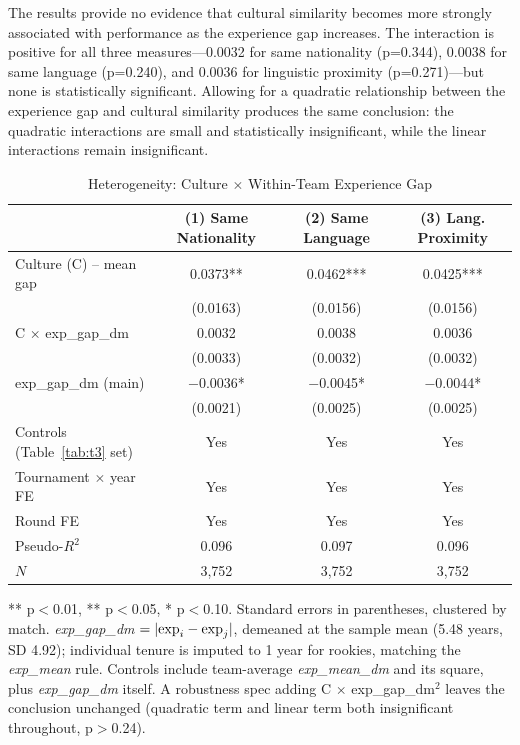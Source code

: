 \documentclass[10pt]{article}
\begin{document}
The results provide no evidence that cultural similarity becomes more strongly associated with performance as the experience gap increases. The interaction is positive for all three measures—0.0032 for same nationality (p=0.344), 0.0038 for same language (p=0.240), and 0.0036 for linguistic proximity (p=0.271)—but none is statistically significant. Allowing for a quadratic relationship between the experience gap and cultural similarity produces the same conclusion: the quadratic interactions are small and statistically insignificant, while the linear interactions remain insignificant.

\begin{table}[htbp]
\color{blue}
\centering
\caption{Heterogeneity: Culture $\times$ Within-Team Experience Gap \label{tab:t6b}}
\begin{threeparttable}
\begin{tabular}{lccc}
\toprule
 & (1) Same Nationality & (2) Same Language & (3) Lang. Proximity \\
\midrule
Culture (C) -- mean gap & 0.0373** & 0.0462*** & 0.0425*** \\
 & (0.0163) & (0.0156) & (0.0156) \\
C $\times$ exp\_gap\_dm & 0.0032 & 0.0038 & 0.0036 \\
 & (0.0033) & (0.0032) & (0.0032) \\
exp\_gap\_dm (main) & $-$0.0036* & $-$0.0045* & $-$0.0044* \\
 & (0.0021) & (0.0025) & (0.0025) \\
\midrule
Controls (Table~\ref{tab:t3} set) & Yes & Yes & Yes \\
Tournament $\times$ year FE & Yes & Yes & Yes \\
Round FE & Yes & Yes & Yes \\
Pseudo-$R^2$ & 0.096 & 0.097 & 0.096 \\
$N$ & 3,752 & 3,752 & 3,752 \\
\bottomrule
\end{tabular}
\begin{tablenotes}
\small
\item *** p$<$0.01, ** p$<$0.05, * p$<$0.10. Standard errors in parentheses, clustered by match. \textit{exp\_gap\_dm} $=|{\rm exp}_i-{\rm exp}_j|$, demeaned at the sample mean (5.48 years, SD 4.92); individual tenure is imputed to 1 year for rookies, matching the \textit{exp\_mean} rule. Controls include team-average \textit{exp\_mean\_dm} and its square, plus \textit{exp\_gap\_dm} itself. A robustness spec adding C $\times$ exp\_gap\_dm$^2$ leaves the conclusion unchanged (quadratic term and linear term both insignificant throughout, p$>$0.24).
\end{tablenotes}
\end{threeparttable}
\end{table}
\FloatBarrier
\end{document}
